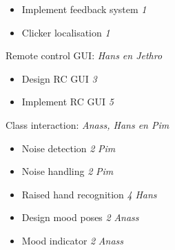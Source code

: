 \documentclass[a4paper,10pt]{report}
\begin{document}
\begin{description}
\begin{itemize}
			\item Implement feedback system \textit{1}
			\item Clicker localisation \textit{1}
		\end{itemize}
	\item Remote control GUI: \textit{Hans en Jethro}
		\begin{itemize}
			\item Design RC GUI \textit{3}
			\item Implement RC GUI \textit{5}
		\end{itemize}
	\item Class interaction: \textit{Anass, Hans en Pim}
		\begin{itemize}
			\item Noise detection \textit{2} \textit{Pim}
			\item Noise handling \textit{2} \textit{Pim}
			\item Raised hand recognition \textit{4} \textit{Hans}
			\item Design mood poses \textit{2} \textit{Anass}
			\item Mood indicator \textit{2} \textit{Anass}
		\end{itemize}
\end{description}
			
\end{document}
